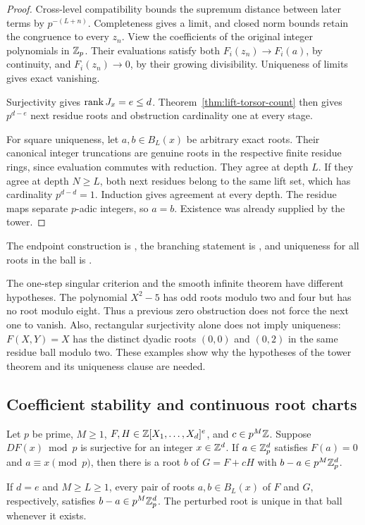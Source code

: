 \begin{proof}
Cross-level compatibility bounds the supremum distance between later terms
by $p^{-(L+n)}$. Completeness gives a limit, and closed norm bounds retain
the congruence to every $z_n$. View the coefficients of the original integer
polynomials in $\mathbb Z_p$. Their evaluations satisfy
both $F_i(z_n)\to F_i(a)$, by continuity, and $F_i(z_n)\to0$, by their
growing divisibility. Uniqueness of limits gives exact vanishing.

Surjectivity gives $\operatorname{rank} J_x=e\le d$. Theorem~\ref{thm:lift-torsor-count}
then gives $p^{d-e}$ next residue roots and obstruction cardinality one at
every stage.

For square uniqueness, let $a,b\in B_L(x)$ be arbitrary exact roots.
Their canonical integer truncations are genuine roots in the respective
finite residue rings, since evaluation commutes with reduction. They agree
at depth $L$. If they agree at depth $N\ge L$, both next residues belong
to the same lift set, which has cardinality $p^{d-d}=1$. Induction gives
agreement at every depth. The residue maps separate $p$-adic integers, so
$a=b$. Existence was already supplied by the tower.
\end{proof}

The endpoint construction is
, the
branching statement is
, and uniqueness
for all roots in the ball is
.

\begin{remark}\label{rem:singular-tower-boundary}
The one-step singular criterion and the smooth infinite theorem have
different hypotheses. The polynomial $X^2-5$ has odd roots modulo two and
four but has no root modulo eight. Thus a previous zero obstruction does
not force the next one to vanish. Also, rectangular surjectivity alone
does not imply uniqueness: $F(X,Y)=X$ has the distinct dyadic roots
$(0,0)$ and $(0,2)$ in the same residue ball modulo two. These examples show
why the hypotheses of the tower theorem and its uniqueness clause are needed.
\end{remark}

\subsection{Coefficient stability and continuous root charts}

\begin{proposition}\label{prop:smooth-coefficient-stability}
Let $p$ be prime, $M\ge1$, $F,H\in\mathbb Z[X_1,\ldots,X_d]^e$, and
$c\in p^M\mathbb Z$. Suppose $DF(x)\bmod p$ is surjective for an integer
$x\in\mathbb Z^d$. If $a\in\mathbb Z_p^d$ satisfies $F(a)=0$ and
$a\equiv x\pmod p$, then there is a root $b$ of $G=F+cH$ with
$b-a\in p^M\mathbb Z_p^d$.

If $d=e$ and $M\ge L\ge1$, every pair of roots $a,b\in B_L(x)$ of
$F$ and $G$, respectively, satisfies $b-a\in p^M\mathbb Z_p^d$. The perturbed
root is unique in that ball whenever it exists.
\end{proposition}


